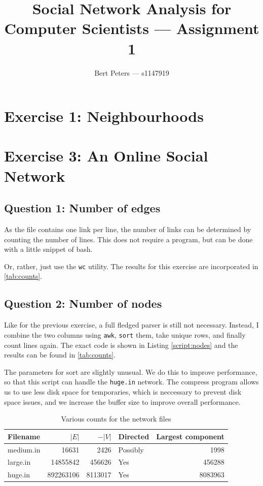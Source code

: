 \documentclass[12pt,a4paper,hidelinks]{article}
\author{Bert Peters --- s1147919}
\title{Social Network Analysis for Computer Scientists --- Assignment 1}
\begin{document}
\maketitle

\section*{Exercise 1: Neighbourhoods}

\section*{Exercise 3: An Online Social Network}

\subsection*{Question 1: Number of edges}

As the file contains one link per line, the number of links can be determined by counting the number of lines. This does not require a program, but can be done with a little snippet of bash.



Or, rather, just use the \texttt{wc} utility. The results for this exercise are incorporated in \autoref{tab:counts}.

\subsection*{Question 2: Number of nodes}

Like for the previous exercise, a full fledged parser is still not necessary. Instead, I combine the two columns using \texttt{awk}, \texttt{sort} them, take unique rows, and finally count lines again. The exact code is shown in Listing \ref{script:nodes} and the results can be found in \autoref{tab:counts}.



The parameters for sort are slightly unusual. We do this to improve performance, so that this script can handle the \texttt{huge.in} network. The compress program allows us to use less disk space for temporaries, which is neccessary to prevent disk space issues, and we increase the buffer size to improve overall performance.

\begin{table}
\centering
\begin{tabular}{l | r | r | l | r}
Filename & {\centering $|E|$} & $-|V|$ & Directed & Largest component\\
\hline
medium.in & 16631 & 2426 & Possibly & 1998 \\
large.in & 14855842 & 456626 & Yes & 456288 \\
huge.in & 892263106 & 8113017 & Yes & 8083963
\end{tabular}
\caption{Various counts for the network files}
\label{tab:counts}
\end{table}
\end{document}
